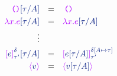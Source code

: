 \[
\begin{array}{r l l}
  \tunit \ssubst{\svar{A}}{\stau} & = & \tunit
  \\[0.3em]
  \tabs{\tvar{x}}{\texp} \ssubst{\svar{A}}{\stau} & = &
  \tabs{\tvar{x}}{\texp\ssubst{\svar{A}}{\stau}}
  \\[0.3em]
  \vdots 
  \\[0.3em]
  \talien{\sexp}{\staup}{\sdelta}\ssubst{\svar{A}}{\stau}  & = &
  \talien{\sexp\ssubst{\svar{A}}{\stau}}{\staup}{\sesubstext{\sdelta}{\svar{A}}{\stau}}
  \\[0.3em]
  \topaque{\sval}  & = & 
  \topaque{\sval \ssubst{\svar{A}}{\stau}}
  \\[0.3em]
\end{array}
\]
